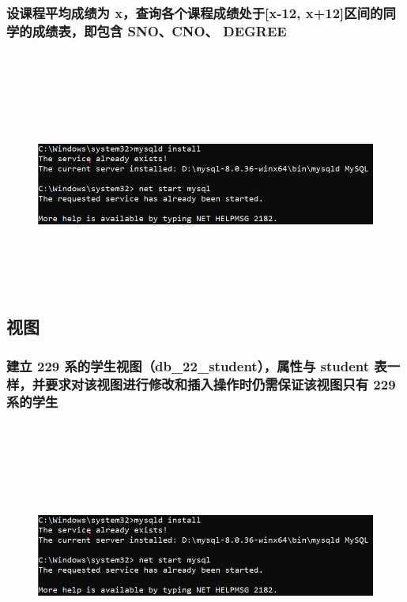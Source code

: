\documentclass{ctexart}
\begin{document}
\subsubsection{设课程平均成绩为 x，查询各个课程成绩处于[x-12, x+12]区间的同学的成绩表，即包含 SNO、CNO、 DEGREE}
\begin{lstlisting}[language=sql]
	
\end{lstlisting}
\begin{figure}[H]
	\centering 
	\includegraphics[height=7cm,width=14cm]{1.png}
	\end{figure}
\subsection{视图}
\subsubsection{建立 229 系的学生视图（db\_22\_student），属性与 student 表一样，并要求对该视图进行修改和插入操作时仍需保证该视图只有 229 系的学生}
\begin{lstlisting}[language=sql]
	
\end{lstlisting}
\begin{figure}[H]
	\centering 
	\includegraphics[height=7cm,width=14cm]{1.png}
	\end{figure}
\end{document}
